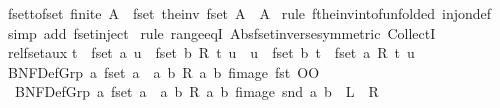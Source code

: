 \begin{isabellebody}
\endisadelimproof
\isanewline
{}\isamarkupfalse%
\ fset{\isacharunderscore}to{\isacharunderscore}fset{\isacharcolon}\ {\isachardoublequoteopen}finite\ A\ {\isasymLongrightarrow}\ fset\ {\isacharparenleft}the{\isacharunderscore}inv\ fset\ A{\isacharparenright}\ {\isacharequal}\ A{\isachardoublequoteclose}\isanewline
%
\isadelimproof
%
\endisadelimproof
%
\isatagproof
{}\isamarkupfalse%
\ {\isacharparenleft}rule\ f{\isacharunderscore}the{\isacharunderscore}inv{\isacharunderscore}into{\isacharunderscore}f{\isacharbrackleft}unfolded\ inj{\isacharunderscore}on{\isacharunderscore}def{\isacharbrackright}{\isacharparenright}\isanewline
{}\isamarkupfalse%
\ {\isacharparenleft}simp\ add{\isacharcolon}\ fset{\isacharunderscore}inject{\isacharparenright}\isanewline
{}\isamarkupfalse%
\ {\isacharparenleft}rule\ range{\isacharunderscore}eqI\ Abs{\isacharunderscore}fset{\isacharunderscore}inverse{\isacharbrackleft}symmetric{\isacharbrackright}\ CollectI{\isacharparenright}{\isacharplus}\isanewline
\isacommand{{\isachardot}}\isamarkupfalse%
%
\endisatagproof
{\isafoldproof}%
%
\isadelimproof
\isanewline
%
\endisadelimproof
\isanewline
{}\isamarkupfalse%
\ rel{\isacharunderscore}fset{\isacharunderscore}aux{\isacharcolon}\isanewline
{\isachardoublequoteopen}{\isacharparenleft}{\isasymforall}t\ {\isasymin}\ fset\ a{\isachardot}\ {\isasymexists}u\ {\isasymin}\ fset\ b{\isachardot}\ R\ t\ u{\isacharparenright}\ {\isasymand}\ {\isacharparenleft}{\isasymforall}u\ {\isasymin}\ fset\ b{\isachardot}\ {\isasymexists}t\ {\isasymin}\ fset\ a{\isachardot}\ R\ t\ u{\isacharparenright}\ {\isasymlongleftrightarrow}\isanewline
\ {\isacharparenleft}{\isacharparenleft}BNF{\isacharunderscore}Def{\isachardot}Grp\ {\isacharbraceleft}a{\isachardot}\ fset\ a\ {\isasymsubseteq}\ {\isacharbraceleft}{\isacharparenleft}a{\isacharcomma}\ b{\isacharparenright}{\isachardot}\ R\ a\ b{\isacharbraceright}{\isacharbraceright}\ {\isacharparenleft}fimage\ fst{\isacharparenright}{\isacharparenright}{\isasyminverse}{\isasyminverse}\ OO\isanewline
\ \ BNF{\isacharunderscore}Def{\isachardot}Grp\ {\isacharbraceleft}a{\isachardot}\ fset\ a\ {\isasymsubseteq}\ {\isacharbraceleft}{\isacharparenleft}a{\isacharcomma}\ b{\isacharparenright}{\isachardot}\ R\ a\ b{\isacharbraceright}{\isacharbraceright}\ {\isacharparenleft}fimage\ snd{\isacharparenright}{\isacharparenright}\ a\ b{\isachardoublequoteclose}\ {\isacharparenleft}\ {\isachardoublequoteopen}{\isacharquery}L\ {\isacharequal}\ {\isacharquery}R{\isachardoublequoteclose}{\isacharparenright}\isanewline

\end{isabellebody}
